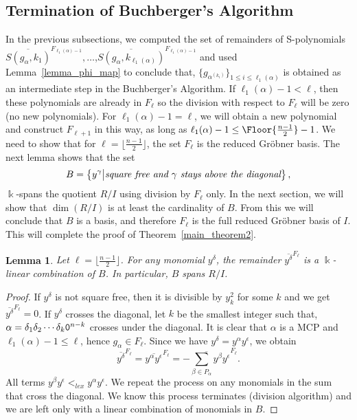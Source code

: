 \documentclass[10pt,a4paper]{article}
\newtheorem{lemma}{Lemma}[section]
\def\field{\Bbbk}
\DeclarePairedDelimiter\Floor\lfloor\rfloor
\begin{document}
\subsection{\label{property_c}Termination of Buchberger's Algorithm}
In the previous subsections, we computed the set of remainders  of S-polynomials $\overline{S(g_\alpha, k_1)}^{F_{\ell_1(\alpha)-1}}, \dots$,\break $\overline{S(g_\alpha, k_{\ell_1(\alpha)})}^{F_{\ell_1(\alpha)-1}}$ and used Lemma~\ref{lemma_phi_map} to conclude that, $\{g_{\alpha^{(k_i)}}\}_{1\le i\le \ell_1(\alpha)}$ is obtained as an intermediate step in the Buchberger's Algorithm. If $\ell_1(\alpha)-1<\ell$, then these polynomials are already in $F_\ell$ so the division with respect to $F_\ell$ will be zero (no new polynomials). For $\ell_1(\alpha)-1=\ell$, we will obtain a new polynomial and construct $F_{\ell+1}$ in this way, as long as $\ell_1(\alpha)-1 \le \Floor{\frac{n-1}{2}}-1$.
We need to show that for $\ell = \lfloor \frac{n-1}{2} \rfloor$, the set $F_\ell$ is the reduced Gr\"obner basis.
The next lemma shows that the set
\begin{equation} \label{Eq:basis1}
	B=\big\{ y^\gamma\big| \text{\it square free and $\gamma$ stays above the diagonal}\big\}\,,
\end{equation}
$\field$-spans the quotient $R/I$ using division by $F_\ell$ only. In the next section, we will show that $\dim(R/I)$ is at least the cardinality of $B$.
From this we will conclude that $B$ is a basis, and therefore $F_\ell$ is the full reduced Gr\"obner basis of $I$. This will complete the proof of Theorem~\ref{main_theorem2}.

\begin{lemma}
	    \label{lem:Bspan}
	    Let $\ell= \lfloor \frac{n-1}{2} \rfloor$. For any monomial $y^\delta$, the remainder $\overline{y^\delta}^{F_\ell}$ is a $\field$-linear combination of $B$. In particular, $B$ spans $R/I$.
    \end{lemma} 

\begin{proof}
If $y^\delta$ is not square free, then it is divisible by $y_k^2$ for some $k$ and we get $\overline{y^\delta}^{F_\ell}=0$. 
If $y^\delta$ crosses the diagonal, 
let $k$ be the smallest integer such that, $\alpha=\delta_1\delta_2\cdots\delta_k \textnormal{\texttt{0}}^{n-k}$ 
crosses under the diagonal. It is clear that $\alpha$ is a MCP and $\ell_1(\alpha)-1\le \ell$, hence $g_\alpha\in F_\ell$. Since we have $y^\delta=y^\alpha y^\epsilon$, we obtain
\begin{equation}\label{eq:contra}
	\overline{y^\delta}^{F_\ell}=\overline{y^\alpha y^\epsilon}^{F_\ell}=\overline{-\sum_{\beta\in P_\alpha}y^\beta y^\epsilon}^{F_\ell}.
\end{equation}
All terms $y^\beta y^\epsilon<_{lex} y^\alpha y^\epsilon$. We repeat the process on any monomials in the sum that cross the diagonal. 
We know this process terminates (division algorithm) and we are left only with a linear combination of monomials in $B$.
\end{proof}
\end{document}
